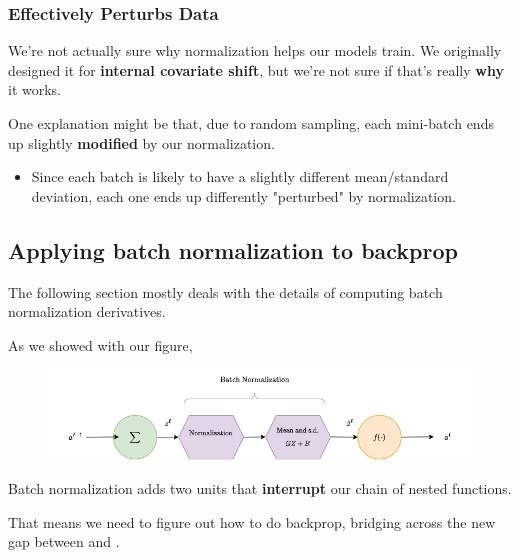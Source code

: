         \subsubsection{Effectively Perturbs Data}

            We're not actually sure why normalization helps our models train. We originally designed it for \textbf{internal covariate shift}, but we're not sure if that's really \textbf{why} it works.

            One explanation might be that, due to random sampling, each mini-batch ends up slightly \textbf{modified} by our normalization.
            
            \begin{itemize}
                \item Since each batch is likely to have a slightly different mean/standard deviation, each one ends up differently "perturbed" by normalization.
            \end{itemize}

    \pagebreak
    \subsection{Applying batch normalization to backprop} 

            \phantom{}

            \begin{remark*}
                The following section mostly deals with the details of computing batch normalization derivatives.
            \end{remark*}

            As we showed with our figure,

            \begin{figure}[H]
                \centering
                    \includegraphics[width=120mm,scale=0.5]{images/nn_2_images/batch_normalization.png}
            \end{figure}

            Batch normalization adds two units that \textbf{interrupt} our chain of nested functions.

            That means we need to figure out how to do backprop, bridging across the new gap between  and .


